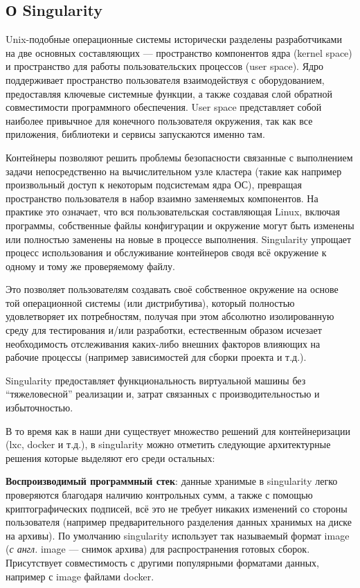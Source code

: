 \documentclass[a4paper]{extarticle}
\begin{document}
\subsection*{О Singularity}

Unix-подобные операционные системы исторически разделены разработчиками на две основных составляющих --- пространство компонентов ядра (kernel space) и пространство для работы пользовательских процессов (user space). Ядро поддерживает пространство пользователя взаимодействуя с оборудованием, предоставляя ключевые системные функции, а также создавая слой обратной совместимости программного обеспечения. User space представляет собой наиболее привычное для конечного пользователя окружения, так как  все приложения, библиотеки и сервисы запускаются именно там.

Контейнеры позволяют решить проблемы безопасности связанные с выполнением задачи непосредственно на вычислительном узле кластера (такие как например произвольный доступ к некоторым подсистемам ядра ОС),  превращая пространство пользователя в набор взаимно заменяемых компонентов. На практике это означает, что вся пользовательская составляющая Linux, включая программы, собственные файлы конфигурации и окружение могут быть изменены или полностью заменены на новые в процессе выполнения. Singularity упрощает процесс использования и обслуживание контейнеров сводя всё окружение к одному и тому же проверяемому файлу.

Это позволяет пользователям создавать своё собственное окружение на основе той операционной системы (или дистрибутива), который полностью удовлетворяет их
потребностям, получая при этом абсолютно изолированную среду для тестирования и/или разработки, естественным образом исчезает необходимость отслеживания каких-либо внешних факторов влияющих на рабочие процессы (например зависимостей для сборки проекта и т.д.).

Singularity предоставляет функциональность виртуальной машины без \enquote{тяжеловесной}  реализации и, затрат связанных с производительностью и избыточностью.

В то время как в наши дни существует множество решений для контейнеризации (lxc, docker и т.д.), в singularity можно отметить следующие архитектурные решения которые выделяют его среди остальных:

\textbf{Воспроизводимый программный стек}: данные хранимые в singularity легко проверяются благодаря наличию контрольных сумм, а также с помощью криптографических подписей, всё это не требует никаких изменений со стороны пользователя (например предварительного разделения данных хранимых на диске на архивы). По умолчанию singularity использует так называемый формат image (\emph{с англ.} image --- снимок архива) для распространения готовых сборок.
Присутствует совместимость с другими популярными форматами данных, например с image файлами docker.
\end{document}

